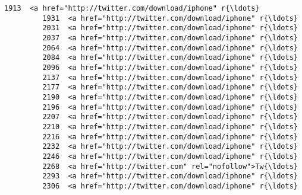 \documentclass[11pt]{article}
\begin{document}
\begin{Verbatim}[commandchars=\\\{\}]
         1913  <a href="http://twitter.com/download/iphone" r{\ldots}   
         1931  <a href="http://twitter.com/download/iphone" r{\ldots}   
         2031  <a href="http://twitter.com/download/iphone" r{\ldots}   
         2037  <a href="http://twitter.com/download/iphone" r{\ldots}   
         2064  <a href="http://twitter.com/download/iphone" r{\ldots}   
         2084  <a href="http://twitter.com/download/iphone" r{\ldots}   
         2096  <a href="http://twitter.com/download/iphone" r{\ldots}   
         2137  <a href="http://twitter.com/download/iphone" r{\ldots}   
         2177  <a href="http://twitter.com/download/iphone" r{\ldots}   
         2190  <a href="http://twitter.com/download/iphone" r{\ldots}   
         2196  <a href="http://twitter.com/download/iphone" r{\ldots}   
         2207  <a href="http://twitter.com/download/iphone" r{\ldots}   
         2210  <a href="http://twitter.com/download/iphone" r{\ldots}   
         2216  <a href="http://twitter.com/download/iphone" r{\ldots}   
         2232  <a href="http://twitter.com/download/iphone" r{\ldots}   
         2246  <a href="http://twitter.com/download/iphone" r{\ldots}   
         2268  <a href="http://twitter.com" rel="nofollow">Tw{\ldots}   
         2293  <a href="http://twitter.com/download/iphone" r{\ldots}   
         2306  <a href="http://twitter.com/download/iphone" r{\ldots}   
         

\end{Verbatim}
\end{document}
